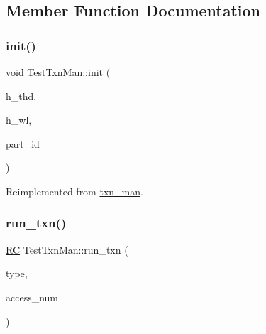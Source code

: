 \subsection{Member Function Documentation}
\mbox{\label{classTestTxnMan_a55bd3947973927a82e87f249813fd4a0}} 
\subsubsection{\texorpdfstring{init()}{init()}}
{\footnotesize\ttfamily void Test\+Txn\+Man\+::init (\begin{DoxyParamCaption}\item[{\hyperlink{classthread__t}{thread\+\_\+t} $\ast$}]{h\+\_\+thd,  }\item[{\hyperlink{classworkload}{workload} $\ast$}]{h\+\_\+wl,  }\item[{uint64\+\_\+t}]{part\+\_\+id }\end{DoxyParamCaption})\hspace{0.3cm}{\ttfamily [virtual]}}



Reimplemented from \hyperlink{classtxn__man_a778925bb3edd6a54a27161f67792edec}{txn\+\_\+man}.

\mbox{\label{classTestTxnMan_a47b1cfbfed234f5a000aa57b773a54c1}} 
\subsubsection{\texorpdfstring{run\+\_\+txn()}{run\_txn()}\hspace{0.1cm}{\footnotesize\ttfamily [1/2]}}
{\footnotesize\ttfamily \hyperlink{global_8h_a78c49a674c810fdd03d20432f7be864a}{RC} Test\+Txn\+Man\+::run\+\_\+txn (\begin{DoxyParamCaption}\item[{int}]{type,  }\item[{int}]{access\+\_\+num }\end{DoxyParamCaption})}

\mbox{\label{classTestTxnMan_ae9510bd3f827a29dcc1239517021ac37}} 
